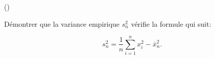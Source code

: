 \begin{exercice}\label{exo1-6} (\minsyndical)

D\'emontrer que la variance empirique $s^2_n$ v\'erifie la formule qui suit:

\[ 
s^2_n = \frac1n \sum_{i=1}^n x_i^2 - \bar{x}^2_n.
\]


\end{exercice}
